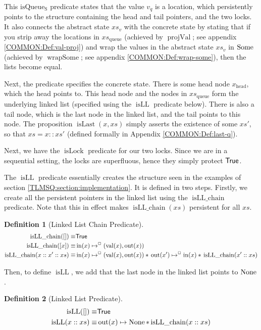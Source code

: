 \documentclass[a4paper, 10pt]{report}
\theoremstyle{definition}
\newtheorem{definition}{Definition}[section]
\newcommand{\isLock}{\operatorname{isLock}}
\newcommand{\isqueueseq}{\operatorname{isQueue_{S}}}
\newcommand{\vq}{v_q}
\newcommand{\xsc}{xs}
\newcommand{\xsqueue}{xs_{\mathrm{queue}}}
\newcommand{\isLLchain}{\operatorname{isLL\_chain}}
\newcommand{\isLL}{\operatorname{isLL}}
\newcommand{\projval}{\operatorname{projVal}}
\newcommand{\wrapsome}{\operatorname{wrapSome}}
\newcommand{\isLast}{\operatorname{isLast}}
\newcommand{\nIn}[1]{\operatorname{in}(#1)}
\newcommand{\nVal}[1]{\operatorname{val}(#1)}
\newcommand{\nOut}[1]{\operatorname{out}(#1)}
\newcommand{\node}{x}
\newcommand{\nodeN}[1]{\node_{\mathrm{#1}}}
\newcommand{\nodehead}{\nodeN{head}}
\newcommand{\absvalueList}{xs_v}
\newcommand{\isNode}[1]{\nIn{#1} \mapsto^{\persistently} (\nVal{#1}, \nOut{#1})}
\begin{document}
This $\isqueueseq$ predicate states that the value $\vq$ is a location, which persistently points to the structure containing the head and tail pointers, and the two locks. It also connects the abstract state $\absvalueList$ with the concrete state by stating that if you strip away the locations in $\xsqueue$ (achieved by $\projval$; see appendix \ref{COMMON:Def:val-proj}) and wrap the values in the abstract state $\absvalueList$ in $\operatorname{Some}$ (achieved by $\wrapsome$; see appendix \ref{COMMON:Def:wrap-some}), then the lists become equal.

Next, the predicate specifies the concrete state. There is some head node $\nodehead$, which the head points to. This head node and the nodes in $\xsqueue$ form the underlying linked list (specified using the $\isLL$ predicate below). There is also a tail node, which is the last node in the linked list, and the tail points to this node. The proposition $\isLast(\node, \xsc)$ simply asserts the existence of some $\xsc'$, so that $\xsc = \node :: \xsc'$ (defined formally in Appendix \ref{COMMON:Def:last-q}).

Next, we have the $\isLock$ predicate for our two locks. Since we are in a sequential setting, the locks are superfluous, hence they simply protect $\textsf{True}$.

The $\isLL$ predicate essentially creates the structure seen in the examples of section \ref{TLMSQ:section:implementation}. It is defined in two steps. Firstly, we create all the persistent pointers in the linked list using the $\isLLchain$ predicate. Note that this in effect makes $\isLLchain(\xsc)$ persistent for all $\xsc$.
\begin{definition}[Linked List Chain Predicate]
  \begin{align*}
    \isLLchain([]) \equiv& \TRUE\\
    \isLLchain([\node]) \equiv& \isNode{\node}\\
    \isLLchain(\node :: \node' :: \xsc) \equiv& \isNode{\node} \star{} \nOut{\node'} \mapsto^{\persistently} \nIn{\node} \star{} \isLLchain(\node' :: \xsc)
  \end{align*}
\end{definition}

Then, to define $\isLL$, we add that the last node in the linked list points to $\operatorname{None}$.
\begin{definition}[Linked List Predicate]
  \begin{align*}
    \isLL([]) \equiv& \TRUE\\
    \isLL(\node :: \xsc) \equiv& \nOut{\node} \mapsto \None \star{} \isLLchain(\node :: \xsc)
  \end{align*}
\end{definition}
\end{document}
